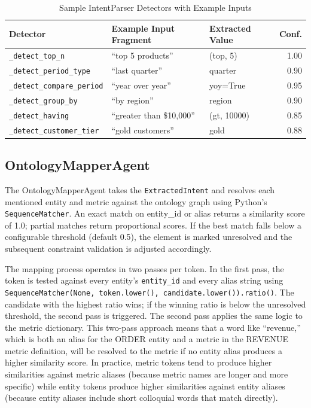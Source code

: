 \documentclass[12pt,a4paper]{report}
\begin{document}
\begin{table}[H]
  \centering
  \caption{Sample IntentParser Detectors with Example Inputs}
  \label{tab:detector-examples}
  \renewcommand{\arraystretch}{1.2}
  \begin{tabularx}{\textwidth}{@{}lXlr@{}}
    \toprule
    \textbf{Detector} & \textbf{Example Input Fragment} & \textbf{Extracted Value} & \textbf{Conf.} \\
    \midrule
    \texttt{\_detect\_top\_n}         & ``top 5 products''      & (top, 5)           & 1.00 \\
    \texttt{\_detect\_period\_type}   & ``last quarter''        & quarter             & 0.90 \\
    \texttt{\_detect\_compare\_period} & ``year over year''     & yoy=True            & 0.95 \\
    \texttt{\_detect\_group\_by}      & ``by region''           & region              & 0.90 \\
    \texttt{\_detect\_having}         & ``greater than \$10,000'' & (gt, 10000)       & 0.85 \\
    \texttt{\_detect\_customer\_tier} & ``gold customers''      & gold                & 0.88 \\
    \bottomrule
  \end{tabularx}
\end{table}

\subsection{OntologyMapperAgent}
\label{subsec:ontology-mapper}

The OntologyMapperAgent takes the \texttt{ExtractedIntent} and resolves each mentioned entity and metric against the ontology graph using Python's \texttt{SequenceMatcher}. An exact match on entity\_id or alias returns a similarity score of 1.0; partial matches return proportional scores. If the best match falls below a configurable threshold (default 0.5), the element is marked unresolved and the subsequent constraint validation is adjusted accordingly.

The mapping process operates in two passes per token. In the first pass, the token is tested against every entity's \texttt{entity\_id} and every alias string using \texttt{SequenceMatcher(None, token.lower(), candidate.lower()).ratio()}. The candidate with the highest ratio wins; if the winning ratio is below the unresolved threshold, the second pass is triggered. The second pass applies the same logic to the metric dictionary. This two-pass approach means that a word like ``revenue,'' which is both an alias for the ORDER entity and a metric in the REVENUE metric definition, will be resolved to the metric if no entity alias produces a higher similarity score. In practice, metric tokens tend to produce higher similarities against metric aliases (because metric names are longer and more specific) while entity tokens produce higher similarities against entity aliases (because entity aliases include short colloquial words that match directly).
\end{document}
